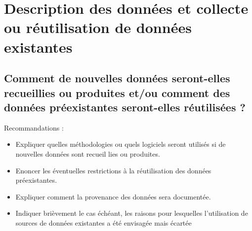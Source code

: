 \documentclass{article}
\begin{document}
\newpage
\tableofcontents
\newpage

\section{Description des données et collecte ou réutilisation de données existantes}
\subsection{Comment de nouvelles données seront-elles recueillies ou produites et/ou comment des données préexistantes seront-elles réutilisées ?}
Recommandations :
\begin{itemize}
    \item Expliquer quelles méthodologies ou quels logiciels seront utilisés si de nouvelles données sont recueil lies ou produites.
    \item Enoncer les éventuelles restrictions à la réutilisation des données préexistantes.
    \item Expliquer comment la provenance des données sera documentée.
    \item Indiquer brièvement le cas échéant, les raisons pour lesquelles l’utilisation de sources de données existantes a été envisagée mais écartée
\end{itemize}
\end{document}
